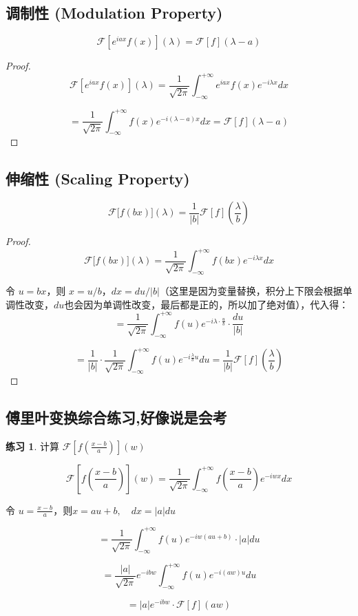 \documentclass[12pt,a4paper]{article}
\theoremstyle{plain}
\theoremstyle{definition}
\newtheorem{exercise}{练习}[section]  %
\theoremstyle{remark}
\begin{document}
	\subsection{调制性 (Modulation Property)}
	
	\[
	\mathcal{F}\left[e^{iax}f(x)\right](\lambda) = \mathcal{F}[f](\lambda - a)
	\]
	\begin{proof}
		
		\[
		\mathcal{F}\left[e^{iax}f(x)\right](\lambda) = \frac{1}{\sqrt{2\pi}} \int_{-\infty}^{+\infty} e^{iax}f(x) e^{-i\lambda x} dx
		\]
		
		\[
		= \frac{1}{\sqrt{2\pi}} \int_{-\infty}^{+\infty} f(x) e^{-i(\lambda - a)x} dx = \mathcal{F}[f](\lambda - a)
		\]
	\end{proof}
	
	\subsection{伸缩性 (Scaling Property)}
	
	\[
	\mathcal{F}\big[f(bx)\big](\lambda) = \frac{1}{|b|} \mathcal{F}[f]\left( \frac{\lambda}{b} \right)
	\]
	\begin{proof}
		
		\[
		\mathcal{F}\big[f(bx)\big](\lambda) = \frac{1}{\sqrt{2\pi}} \int_{-\infty}^{+\infty} f(bx) e^{-i\lambda x} dx
		\]
		
		令 $u = bx$，则 $x = u/b$，$dx = du/|b|$（这里是因为变量替换，积分上下限会根据单调性改变，$du$也会因为单调性改变，最后都是正的，所以加了绝对值），代入得：
		\[
		= \frac{1}{\sqrt{2\pi}} \int_{-\infty}^{+\infty} f(u) e^{-i\lambda \cdot \frac{u}{b}} \cdot \frac{du}{|b|}
		\]
		
		\[
		= \frac{1}{|b|} \cdot \frac{1}{\sqrt{2\pi}} \int_{-\infty}^{+\infty} f(u) e^{-i\frac{\lambda}{b}u} du = \frac{1}{|b|} \mathcal{F}[f]\left( \frac{\lambda}{b} \right)
		\]
	\end{proof}
	
	\subsection{傅里叶变换综合练习,好像说是会考}
	
	\begin{exercise}
		计算 $\mathcal{F}\left[ f\left( \frac{x-b}{a} \right) \right](w)$
		
		
		\[
		\mathcal{F}\left[ f\left( \frac{x-b}{a} \right) \right](w) = \frac{1}{\sqrt{2\pi}} \int_{-\infty}^{+\infty} f\left( \frac{x-b}{a} \right) e^{-iwx} dx
		\]
		
		令 $u = \frac{x-b}{a}$，则$x = au + b, \quad dx = |a|du$
		
		\[
		= \frac{1}{\sqrt{2\pi}} \int_{-\infty}^{+\infty} f(u) e^{-iw(au+b)} \cdot |a|du
		\]
		
		\[
		= \frac{|a|}{\sqrt{2\pi}} e^{-ibw} \int_{-\infty}^{+\infty} f(u) e^{-i(a w)u} du
		\]
		
		\[
		= |a| e^{-ibw} \cdot \mathcal{F}[f](aw)
		\]
		
	\end{exercise}
	
\end{document}
